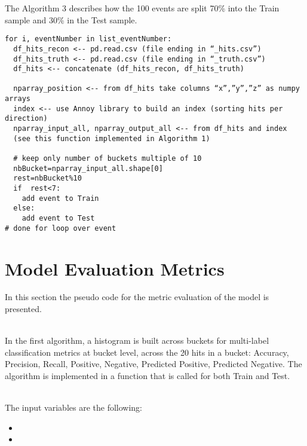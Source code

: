 The Algorithm 3 describes how the 100 events are split 70\% into the Train sample and 30\% in the Test sample.
\begin{verbatim}
for i, eventNumber in list_eventNumber:
  df_hits_recon <-- pd.read.csv (file ending in “_hits.csv”)
  df_hits_truth <-- pd.read.csv (file ending in “_truth.csv”)
  df_hits <-- concatenate (df_hits_recon, df_hits_truth)

  nparray_position <-- from df_hits take columns “x”,”y”,”z” as numpy arrays
  index <-- use Annoy library to build an index (sorting hits per direction)
  nparray_input_all, nparray_output_all <-- from df_hits and index
  (see this function implemented in Algorithm 1)
	
  # keep only number of buckets multiple of 10
  nbBucket=nparray_input_all.shape[0]
  rest=nbBucket%10
  if  rest<7:
    add event to Train
  else:
    add event to Test
# done for loop over event
\end{verbatim}

\section{Model Evaluation Metrics}
\label{sec:AppendixModelEvaluationMetrics}

In this section the pseudo code for the metric evaluation of the model is presented.

\ \\In the first algorithm, a histogram is built across buckets for multi-label classification metrics at bucket level, across the 20 hits in a bucket: Accuracy, Precision, Recall, Positive, Negative, Predicted Positive, Predicted Negative. The algorithm is implemented in a function that is called for both Train and Test.

\ \\The input variables are the following:
\begin{itemize}
\item {}
\item {}
\end{itemize}


